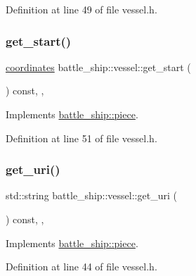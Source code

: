 Definition at line 49 of file vessel.\+h.

\mbox{\label{classbattle__ship_1_1vessel_aba133e1debe50caa9cbbae5e867b5995}} 
\subsubsection{\texorpdfstring{get\+\_\+start()}{get\_start()}}
{\footnotesize\ttfamily \hyperlink{structbattle__ship_1_1coordinates}{coordinates} battle\+\_\+ship\+::vessel\+::get\+\_\+start (\begin{DoxyParamCaption}{ }\end{DoxyParamCaption}) const\hspace{0.3cm}{\ttfamily [inline]}, {\ttfamily [override]}, {\ttfamily [virtual]}}



Implements \hyperlink{classbattle__ship_1_1piece_ab5010cea30b96f5afc758b2a9d0d43bc}{battle\+\_\+ship\+::piece}.



Definition at line 51 of file vessel.\+h.

\mbox{\label{classbattle__ship_1_1vessel_a3ab0850a3ccedf7e6083c7b494284289}} 
\subsubsection{\texorpdfstring{get\+\_\+uri()}{get\_uri()}}
{\footnotesize\ttfamily std\+::string battle\+\_\+ship\+::vessel\+::get\+\_\+uri (\begin{DoxyParamCaption}{ }\end{DoxyParamCaption}) const\hspace{0.3cm}{\ttfamily [inline]}, {\ttfamily [override]}, {\ttfamily [virtual]}}



Implements \hyperlink{classbattle__ship_1_1piece_aeba6c5083cb05200850cee7578a81d09}{battle\+\_\+ship\+::piece}.



Definition at line 44 of file vessel.\+h.

